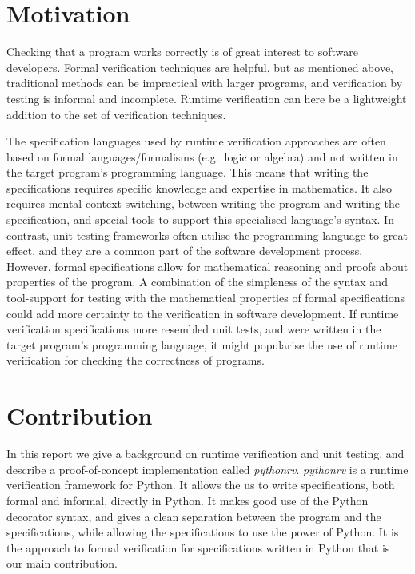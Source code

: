 \section{Motivation}

Checking that a program works correctly is of great interest to software
developers. Formal verification techniques are helpful, but as mentioned above,
traditional methods can be impractical with larger programs, and verification
by testing is informal and incomplete. Runtime verification can here be a
lightweight addition to the set of verification techniques.

The specification languages used by runtime verification approaches are often
based on formal languages/formalisms (e.g.\ logic or algebra) and not written
in the target program's programming language. This means that writing the
specifications requires specific knowledge and expertise in mathematics. It
also requires mental context-switching, between writing the program and writing
the specification, and special tools to support this specialised language's
syntax. In contrast, unit testing frameworks often utilise the programming
language to great effect, and they are a common part of the software
development process. However, formal specifications allow for mathematical
reasoning and proofs about properties of the program. A combination of the
simpleness of the syntax and tool-support for testing with the mathematical
properties of formal specifications could add more certainty to the
verification in software development. If runtime verification specifications
more resembled unit tests, and were written in the target program's programming
language, it might popularise the use of runtime verification for checking the
correctness of programs.


\section{Contribution}

In this report we give a background on runtime verification and unit testing,
and describe a proof-of-concept implementation called \textit{pythonrv}.
\textit{pythonrv} is a runtime verification framework for Python. It allows the
us to write specifications, both formal and informal,
directly in Python. It makes good use of the Python decorator syntax, and gives
a clean separation between the program and the specifications, while allowing
the specifications to use the power of Python. It is the approach to formal
verification for specifications written in Python that is our main
contribution.

